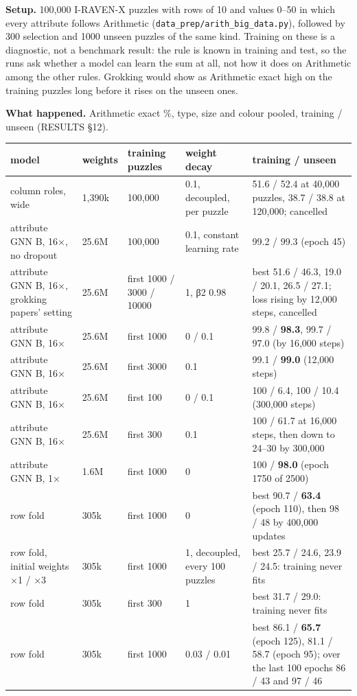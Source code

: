 \textbf{Setup.} 100,000 I-RAVEN-X puzzles with rows of 10 and values 0–50 in which every attribute follows Arithmetic (\texttt{data\_prep/arith\_big\_data.py}), followed by 300 selection and 1000 unseen puzzles of the same kind. Training on these is a diagnostic, not a benchmark result: the rule is known in training and test, so the runs ask whether a model can learn the sum at all, not how it does on Arithmetic among the other rules. Grokking would show as Arithmetic exact high on the training puzzles long before it rises on the unseen ones.

\textbf{What happened.} Arithmetic exact \%, type, size and colour pooled, training / unseen (RESULTS \S{}12).

\begin{center}\small
\begin{tabularx}{\linewidth}{@{}YlYYY@{}}
\toprule
model & weights & training puzzles & weight decay & training / unseen \\
\midrule
column roles, wide & 1,390k & 100,000 & 0.1, decoupled, per puzzle & 51.6 / 52.4 at 40,000 puzzles, 38.7 / 38.8 at 120,000; cancelled \\
attribute GNN B, 16×, no dropout & 25.6M & 100,000 & 0.1, constant learning rate & 99.2 / 99.3 (epoch 45) \\
attribute GNN B, 16×, grokking papers' setting & 25.6M & first 1000 / 3000 / 10000 & 1, β2 0.98 & best 51.6 / 46.3, 19.0 / 20.1, 26.5 / 27.1; loss rising by 12,000 steps, cancelled \\
attribute GNN B, 16× & 25.6M & first 1000 & 0 / 0.1 & 99.8 / \textbf{98.3}, 99.7 / 97.0 (by 16,000 steps) \\
attribute GNN B, 16× & 25.6M & first 3000 & 0.1 & 99.1 / \textbf{99.0} (12,000 steps) \\
attribute GNN B, 16× & 25.6M & first 100 & 0 / 0.1 & 100 / 6.4, 100 / 10.4 (300,000 steps) \\
attribute GNN B, 16× & 25.6M & first 300 & 0.1 & 100 / 61.7 at 16,000 steps, then down to 24–30 by 300,000 \\
attribute GNN B, 1× & 1.6M & first 1000 & 0 & 100 / \textbf{98.0} (epoch 1750 of 2500) \\
row fold & 305k & first 1000 & 0 & best 90.7 / \textbf{63.4} (epoch 110), then 98 / 48 by 400,000 updates \\
row fold, initial weights ×1 / ×3 & 305k & first 1000 & 1, decoupled, every 100 puzzles & best 25.7 / 24.6, 23.9 / 24.5: training never fits \\
row fold & 305k & first 300 & 1 & best 31.7 / 29.0: training never fits \\
row fold & 305k & first 1000 & 0.03 / 0.01 & best 86.1 / \textbf{65.7} (epoch 125), 81.1 / 58.7 (epoch 95); over the last 100 epochs 86 / 43 and 97 / 46 \\
\bottomrule
\end{tabularx}
\end{center}

